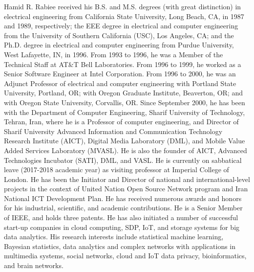 \documentclass[10pt,journal,compsoc]{IEEEtran}
\begin{document}
\begin{IEEEbiography}{Hamid R. Rabiee}
received his B.S. and M.S. degrees (with great distinction) in electrical engineering from California State University, Long Beach, CA, in 1987 and 1989, respectively; the EEE degree in electrical and computer engineering from the University of Southern California (USC), Los Angeles, CA; and the Ph.D. degree in electrical and computer engineering from Purdue University, West Lafayette, IN, in 1996. From 1993 to 1996, he was a Member of the Technical Staff at AT\&T Bell Laboratories. From 1996 to 1999, he worked as a Senior Software Engineer at Intel Corporation. From 1996 to 2000, he was an Adjunct Professor of electrical and computer engineering with Portland State University, Portland, OR; with Oregon Graduate Institute, Beaverton, OR; and with Oregon State University, Corvallis, OR. Since September 2000, he has been with the Department of Computer Engineering, Sharif University of Technology, Tehran, Iran, where he is a Professor of computer engineering, and Director of Sharif University Advanced Information and Communication Technology Research Institute (AICT), Digital Media Laboratory (DML), and Mobile Value Added Services Laboratory (MVASL). He is also the founder of AICT, Advanced Technologies Incubator (SATI), DML, and VASL. He is currently on sabbatical leave (2017-2018 academic year) as visiting professor at Imperial College of London. He has been the Initiator and Director of national and international-level projects in the context of United Nation Open Source Network program and Iran National ICT Development Plan. He has received numerous awards and honors for his industrial, scientific, and academic contributions. He is a Senior Member of IEEE, and holds three patents. He has also initiated a number of successful start-up companies in cloud computing, SDP, IoT, and storage systems for big data analytics. His research interests include statistical machine learning, Bayesian statistics, data analytics and complex networks with applications in multimedia systems, social networks, cloud and IoT data privacy, bioinformatics, and brain networks.
\end{IEEEbiography}


\end{document}
